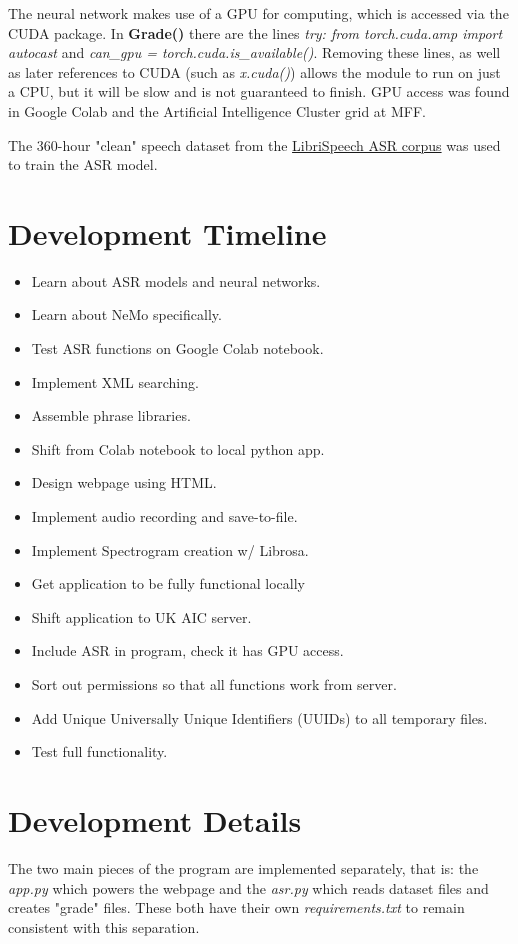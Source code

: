 \documentclass[12pt, letterpaper]{article}
\begin{document}
The neural network makes use of a GPU for computing, which is accessed via the CUDA package. In \textbf{Grade()} there are the lines \textit{try: from torch.cuda.amp import autocast} and \textit{can\_gpu = torch.cuda.is\_available()}. Removing these lines, as well as later references to CUDA (such as \textit{x.cuda()}) allows the module to run on just a CPU, but it will be slow and is not guaranteed to finish. GPU access was found in Google Colab and the Artificial Intelligence Cluster grid at MFF.

The 360-hour "clean" speech dataset from the \href{http://www.openslr.org/12/}{LibriSpeech ASR corpus} was used to train the ASR model.

\section*{Development Timeline}
\begin{itemize}
\item{Learn about ASR models and neural networks.}
\item{Learn about NeMo specifically.}
\item{Test ASR functions on Google Colab notebook.}
\item{Implement XML searching.}
\item{Assemble phrase libraries.}
\item{Shift from Colab notebook to local python app.}
\item{Design webpage using HTML.}
\item{Implement audio recording and save-to-file.}
\item{Implement Spectrogram creation w/ Librosa.}
\item{Get application to be fully functional locally}
\item{Shift application to UK AIC server.}
\item{Include ASR in program, check it has GPU access.}
\item{Sort out permissions so that all functions work from server.}
\item{Add Unique Universally Unique Identifiers (UUIDs) to all temporary files.}
\item{Test full functionality.}
\end{itemize}
\newpage%


\section*{Development Details}
The two main pieces of the program are implemented separately, that is: the \textit{app.py} which powers the webpage and the \textit{asr.py} which reads dataset files and creates "grade" files. These both have their own \textit{requirements.txt} to remain consistent with this separation. 
\end{document}
